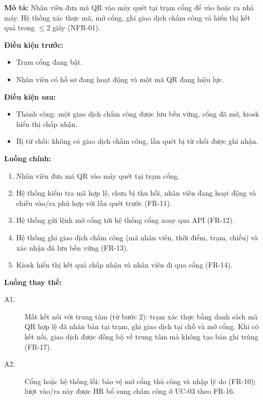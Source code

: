 \noindent\textbf{Mô tả:} Nhân viên đưa mã QR vào máy quét tại trạm cổng để vào hoặc ra nhà máy. Hệ thống xác thực mã, mở cổng, ghi giao dịch chấm công và hiển thị kết quả trong $\leq 2$ giây (NFR-01).

\noindent\textbf{Điều kiện trước:}
\begin{itemize}
    \item Trạm cổng đang bật.
    \item Nhân viên có hồ sơ đang hoạt động và một mã QR đang hiệu lực.
\end{itemize}

\noindent\textbf{Điều kiện sau:}
\begin{itemize}
    \item Thành công: một giao dịch chấm công được lưu bền vững, cổng đã mở, kiosk hiển thị chấp nhận.
    \item Bị từ chối: không có giao dịch chấm công, lần quét bị từ chối được ghi nhận.
\end{itemize}

\noindent\textbf{Luồng chính:}
\begin{enumerate}
    \item Nhân viên đưa mã QR vào máy quét tại trạm cổng.
    \item Hệ thống kiểm tra mã hợp lệ, chưa bị thu hồi, nhân viên đang hoạt động và chiều vào/ra phù hợp với lần quét trước (FR-11).
    \item Hệ thống gửi lệnh mở cổng tới hệ thống cổng xoay qua API (FR-12).
    \item Hệ thống ghi giao dịch chấm công (mã nhân viên, thời điểm, trạm, chiều) và xác nhận đã lưu bền vững (FR-13).
    \item Kiosk hiển thị kết quả chấp nhận và nhân viên đi qua cổng (FR-14).
\end{enumerate}

\noindent\textbf{Luồng thay thế:}
\begin{description}
    \item[A1.] Mất kết nối với trung tâm (từ bước 2): trạm xác thực bằng danh sách mã QR hợp lệ đã nhân bản tại trạm, ghi giao dịch tại chỗ và mở cổng. Khi có kết nối, giao dịch được đồng bộ về trung tâm mà không tạo bản ghi trùng (FR-17).
    \item[A2.] Cổng hoặc hệ thống lỗi: bảo vệ mở cổng thủ công và nhập lý do (FR-10); lượt vào/ra này được HR bổ sung chấm công ở UC-03 theo FR-16.
\end{description}

